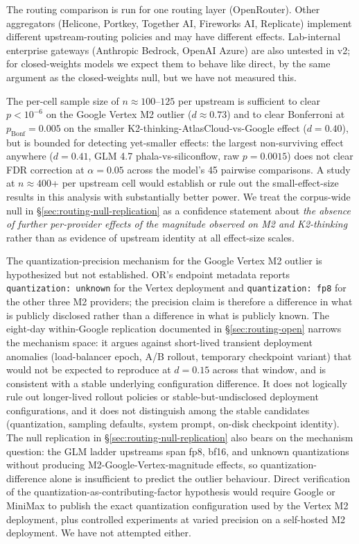 \documentclass[11pt,a4paper]{article}
\begin{document}
The routing comparison is run for one routing layer (OpenRouter). Other aggregators (Helicone, Portkey, Together AI, Fireworks AI, Replicate) implement different upstream-routing policies and may have different effects. Lab-internal enterprise gateways (Anthropic Bedrock, OpenAI Azure) are also untested in v2; for closed-weights models we expect them to behave like direct, by the same argument as the closed-weights null, but we have not measured this.

The per-cell sample size of $n \approx 100$--$125$ per upstream is sufficient to clear $p < 10^{-6}$ on the Google Vertex M2 outlier ($d \approx 0.73$) and to clear Bonferroni at $p_\text{Bonf}{=}0.005$ on the smaller K2-thinking-AtlasCloud-vs-Google effect ($d{=}0.40$), but is bounded for detecting yet-smaller effects: the largest non-surviving effect anywhere ($d{=}0.41$, GLM 4.7 phala-vs-siliconflow, raw $p{=}0.0015$) does not clear FDR correction at $\alpha{=}0.05$ across the model's 45 pairwise comparisons. A study at $n \approx 400$+ per upstream cell would establish or rule out the small-effect-size results in this analysis with substantially better power. We treat the corpus-wide null in \S\ref{sec:routing-null-replication} as a confidence statement about \emph{the absence of further per-provider effects of the magnitude observed on M2 and K2-thinking} rather than as evidence of upstream identity at all effect-size scales.

The quantization-precision mechanism for the Google Vertex M2 outlier is hypothesized but not established. OR's endpoint metadata reports \texttt{quantization: unknown} for the Vertex deployment and \texttt{quantization: fp8} for the other three M2 providers; the precision claim is therefore a difference in what is publicly disclosed rather than a difference in what is publicly known. The eight-day within-Google replication documented in \S\ref{sec:routing-open} narrows the mechanism space: it argues against short-lived transient deployment anomalies (load-balancer epoch, A/B rollout, temporary checkpoint variant) that would not be expected to reproduce at $d{=}0.15$ across that window, and is consistent with a stable underlying configuration difference. It does not logically rule out longer-lived rollout policies or stable-but-undisclosed deployment configurations, and it does not distinguish among the stable candidates (quantization, sampling defaults, system prompt, on-disk checkpoint identity). The null replication in \S\ref{sec:routing-null-replication} also bears on the mechanism question: the GLM ladder upstreams span fp8, bf16, and unknown quantizations without producing M2-Google-Vertex-magnitude effects, so quantization-difference alone is insufficient to predict the outlier behaviour. Direct verification of the quantization-as-contributing-factor hypothesis would require Google or MiniMax to publish the exact quantization configuration used by the Vertex M2 deployment, plus controlled experiments at varied precision on a self-hosted M2 deployment. We have not attempted either.
\end{document}
